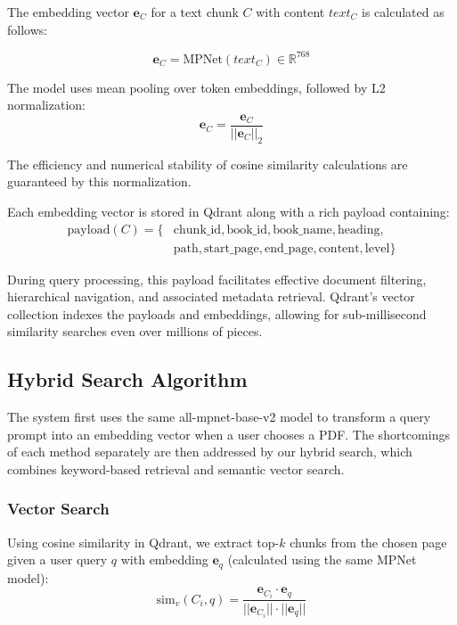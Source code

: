 \documentclass[runningheads]{llncs}
\begin{document}
The embedding vector $\mathbf{e}_C$ for a text chunk $C$ with content $text_C$ is calculated as follows:

\begin{equation}
\mathbf{e}_C = \mathrm{MPNet}(text_C) \in \mathbb{R}^{768}
\end{equation}

The model uses mean pooling over token embeddings, followed by L2 normalization:
\begin{equation}
\mathbf{e}_C = \frac{\mathbf{e}_C}{||\mathbf{e}_C||_2}
\end{equation}

The efficiency and numerical stability of cosine similarity calculations are guaranteed by this normalization.

Each embedding vector is stored in Qdrant along with a rich payload containing:
\begin{equation}
\begin{split}
\mathrm{payload}(C) = \{&\mathrm{chunk\_id}, \mathrm{book\_id}, \mathrm{book\_name}, \mathrm{heading}, \\
&\mathrm{path}, \mathrm{start\_page}, \mathrm{end\_page}, \mathrm{content}, \mathrm{level}\}
\end{split}
\end{equation}

During query processing, this payload facilitates effective document filtering, hierarchical navigation, and associated metadata retrieval. Qdrant's vector collection indexes the payloads and embeddings, allowing for sub-millisecond similarity searches even over millions of pieces.

\subsection{Hybrid Search Algorithm}

The system first uses the same all-mpnet-base-v2 model to transform a query prompt into an embedding vector when a user chooses a PDF. The shortcomings of each method separately are then addressed by our hybrid search, which combines keyword-based retrieval and semantic vector search.

\subsubsection{Vector Search}

Using cosine similarity in Qdrant, we extract top-$k$ chunks from the chosen page given a user query $q$ with embedding $\mathbf{e}_q$ (calculated using the same MPNet model):
\begin{equation}
\mathrm{sim}_v(C_i, q) = \frac{\mathbf{e}_{C_i} \cdot \mathbf{e}_q}{||\mathbf{e}_{C_i}|| \cdot ||\mathbf{e}_q||}
\end{equation}
\end{document}
